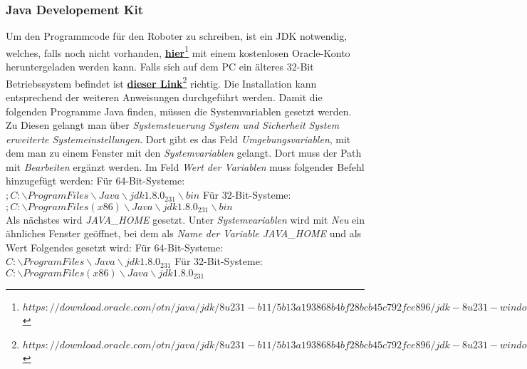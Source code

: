 \documentclass[
	ngerman,
	accentcolor=1c,%
	]{tudapub}
\begin{document}
\subsubsection{Java Developement Kit}
Um den Programmcode f\"ur den Roboter zu schreiben, ist ein JDK notwendig, welches, falls noch nicht vorhanden, 
\href{https://download.oracle.com/otn/java/jdk/8u231-b11/5b13a193868b4bf28bcb45c792fce896/jdk-8u231-windows-x64.exe}{\textbf{hier}\footnote{$https://download.oracle.com/otn/java/jdk/8u231-b11/5b13a193868b4bf28bcb45c792fce896/jdk-8u231-windows-x64.exe$}}
mit einem kostenlosen Oracle-Konto heruntergeladen werden kann. Falls sich auf dem PC ein \"alteres 32-Bit Betriebssystem befindet ist 
\href{https://download.oracle.com/otn/java/jdk/8u231-b11/5b13a193868b4bf28bcb45c792fce896/jdk-8u231-windows-i586.exe}{\textbf{dieser Link}\footnote{$https://download.oracle.com/otn/java/jdk/8u231-b11/5b13a193868b4bf28bcb45c792fce896/jdk-8u231-windows-i586.exe$}}
richtig. Die Installation kann entsprechend der weiteren Anweisungen durchgef\"uhrt werden.\newline
Damit die folgenden Programme Java finden, m\"ussen die Systemvariablen gesetzt werden. Zu Diesen gelangt man \"uber \textit{Systemsteuerung} \rightarrow{} \textit{System und Sicherheit} \rightarrow{} \textit{System} \rightarrow{} \textit{erweiterte Systemeinstellungen}. Dort gibt es das Feld \textit{Umgebungsvariablen}, mit dem man zu einem Fenster mit den \textit{Systemvariablen} gelangt. Dort muss der Path mit \textit{Bearbeiten} erg\"anzt werden. Im Feld \textit{Wert der Variablen} muss folgender Befehl hinzugef\"ugt werden:\newline
F\"ur 64-Bit-Systeme:\\$;C:\backslash ProgramFiles\backslash Java\backslash jdk1.8.0_231\backslash bin$\newline
F\"ur 32-Bit-Systeme:\\$;C:\backslash ProgramFiles(x86)\backslash Java\backslash jdk1.8.0_231\backslash bin$\\
Als n\"achstes wird \textit{JAVA\_HOME} gesetzt. Unter \textit{Systemvariablen} wird mit \textit{Neu} ein \"ahnliches Fenster ge\"offnet, bei dem als  \textit{Name der Variable JAVA\_HOME} und als Wert Folgendes gesetzt wird:\newline
F\"ur 64-Bit-Systeme:\\$C:\backslash ProgramFiles\backslash Java\backslash jdk1.8.0_231$
F\"ur 32-Bit-Systeme:\\$C:\backslash ProgramFiles(x86)\backslash Java\backslash jdk1.8.0_231$\\
\end{document}
